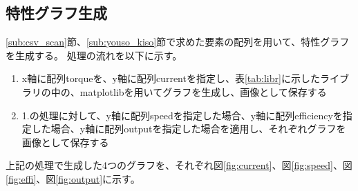 \subsection{特性グラフ生成}\label{sub:toku_gurahu}
\ref{sub:csv_scan}節、\ref{sub:youso_kiso}節で求めた要素の配列を用いて、特性グラフを生成する。
処理の流れを以下に示す。
\begin{enumerate}
    \item x軸に配列torqueを、y軸に配列currentを指定し、表\ref{tab:libr}に示したライブラリの中の、matplotlibを用いてグラフを生成し、画像として保存する
    \item 1.の処理に対して、y軸に配列speedを指定した場合、y軸に配列efficiencyを指定した場合、y軸に配列outputを指定した場合を適用し、それぞれグラフを画像として保存する
\end{enumerate}
上記の処理で生成した4つのグラフを、それぞれ図\ref{fig:current}、図\ref{fig:speed}、図\ref{fig:effi}、図\ref{fig:output}に示す。

